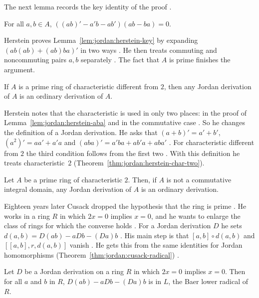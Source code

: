 The next lemma records the key identity of the proof
\cite[Lemma~3.3, p.~1107]{Herstein1957}.

\begin{lemma}\label{lem:jordan:herstein-key}
For all $a,b\in A$, $((ab)'-a'b-ab')(ab-ba)=0$.
\end{lemma}

Herstein proves Lemma~\ref{lem:jordan:herstein-key} by expanding
$(ab(ab)+(ab)ba)'$ in two ways \cite[p.~1107]{Herstein1957}. He then treats
commuting and noncommuting pairs $a,b$ separately
\cite[pp.~1107--1110]{Herstein1957}. The fact that $A$ is prime finishes the
argument.

\begin{theorem}\label{thm:jordan:herstein}
If $A$ is a prime ring of characteristic different from $2$, then any Jordan
derivation of $A$ is an ordinary derivation of $A$.
\end{theorem}

Herstein notes that the characteristic is used in only two places: in the
proof of Lemma~\ref{lem:jordan:herstein-aba} and in the commutative case
\cite[p.~1110]{Herstein1957}. So he changes the definition of a Jordan
derivation. He asks that $(a+b)'=a'+b'$, $(a^{2})'=aa'+a'a$ and
$(aba)'=a'ba+ab'a+aba'$ \cite[p.~1110]{Herstein1957}. For characteristic
different from $2$ the third
condition follows from the first two \cite[p.~1110]{Herstein1957}. With this
definition he treats characteristic~$2$
(Theorem~\ref{thm:jordan:herstein-char-two}).

\begin{theorem}\label{thm:jordan:herstein-char-two}
Let $A$ be a prime ring of characteristic $2$. Then, if $A$ is not a commutative integral
domain, any Jordan derivation of $A$ is an ordinary derivation.
\end{theorem}

Eighteen years later Cusack dropped the hypothesis that the ring is prime
\cite[p.~321]{Cusack1975}. He works in a ring $R$ in which $2x=0$ implies
$x=0$, and he wants to enlarge the class of rings for which the converse holds
\cite[p.~321]{Cusack1975}. For a Jordan derivation $D$ he sets
$d(a,b)=D(ab)-aDb-(Da)b$ \cite[p.~321]{Cusack1975}. His main step is that
$[a,b]\circ d(a,b)$ and $[[a,b],r,d(a,b)]$ vanish \cite[Lemma~2,
p.~322]{Cusack1975}. He gets this from the same identities for Jordan
homomorphisms (Theorem~\ref{thm:jordan:cusack-radical}) \cite[Lemma~1,
p.~322]{Cusack1975}.\begin{theorem}\label{thm:jordan:cusack-radical} Let $D$ be a
Jordan derivation on a ring $R$ in which $2x=0$ implies $x=0$. Then for all
$a$ and $b$ in $R$, $D(ab)-aDb-(Da)b$ is in $L$, the Baer lower radical of
$R$. \end{theorem}

